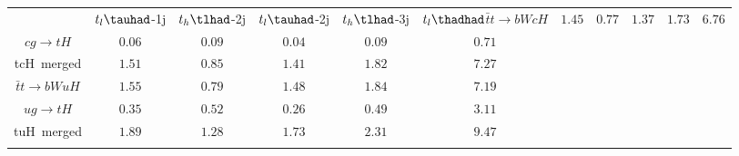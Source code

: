\centering
\begin{tabular}{|c|c|c|c|c|c|} \toprule\toprule
 & $t_{l}\tauhad$-1j & $t_{h}\tlhad$-2j & $t_{l}\tauhad$-2j & $t_{h}\tlhad$-3j & $t_{l}\thadhad$$\bar{t}t\to bWcH$ & $1.45$ & $0.77$ & $1.37$ & $1.73$ & $6.76$\\
$cg\to tH$ & $0.06$ & $0.09$ & $0.04$ & $0.09$ & $0.71$\\
tcH~merged & $1.51$ & $0.85$ & $1.41$ & $1.82$ & $7.27$\\
$\bar{t}t\to bWuH$ & $1.55$ & $0.79$ & $1.48$ & $1.84$ & $7.19$\\
$ug\to tH$ & $0.35$ & $0.52$ & $0.26$ & $0.49$ & $3.11$\\
tuH~merged & $1.89$ & $1.28$ & $1.73$ & $2.31$ & $9.47$\\
\bottomrule\bottomrule\\
\end{tabular}
